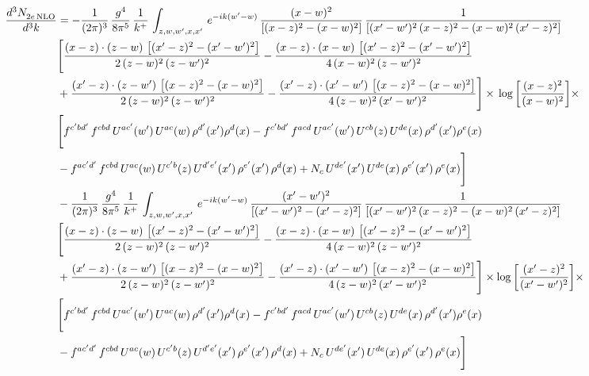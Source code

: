 \documentclass[9pt]{article}
\numberwithin{equation}{section}
\begin{document}
\begin{align}
 \frac{d^{3}N_{2e\,\rm NLO}^{\rm}}{d^{3}k}  & =   -\frac{1}{(2\pi)^{3}}\, \frac{g^{4}}{8\pi^{5}}\,\frac{1}{k^{+}}\,\int_{z,w,w^{\prime},x,x'}\, e^{-ik(w^{\prime}-w)}\,\frac{(x-w)^{2}}{\left[(x-z)^{2}-(x-w)^{2}\right]}\, \frac{1}{\left[(x'-w')^{2}\, (x-z)^{2} - (x-w)^{2}\, (x'-z)^{2}\right]} \notag \\ & \Bigg[\frac{(x-z)\cdot (z-w)\, \left[(x'-z)^{2}-(x'-w')^{2}\right]}{2\, (z-w)^{2}\, (z-w')^{2}}  - \frac{(x-z)\cdot (x-w)\,\left[(x'-z)^{2}-(x'-w')^{2}\right] }{4\,(x-w)^{2}\,(z-w')^{2}}\notag \\ & +\frac{(x'-z)\cdot (z-w')\, \left[(x-z)^{2}-(x-w)^{2}\right]}{2\, (z-w)^{2}\, (z-w')^{2}}-\frac{(x'-z)\cdot (x'-w')\, \left[(x-z)^{2}-(x-w)^{2}\right]}{4\, (z-w)^{2}\,(x'-w')^{2}}\Bigg]\times\, \log{\left[\frac{(x-z)^{2}}{(x-w)^{2}}\right]}\times\,\notag \\ & \Bigg[f^{c'bd'}\,f^{cbd}\, U^{ac'}(w')\,U^{ac}(w)\,\rho^{d'}(x')\rho^{d}(x)- f^{c'bd'}\,f^{acd}\,U^{ac'}(w')\,U^{cb}(z)\,U^{de}(x)\,\rho^{d'}(x')\rho^{e}(x) \notag \\ & -f^{ac'd'}\,f^{cbd}\,U^{ac}(w)\,U^{c'b}(z)\,U^{d'e'}(x')\,\rho^{e'}(x')\,\rho^{d}(x) +N_{c}\,U^{de'}(x')\,U^{de}(x)\,\rho^{e'}(x')\,\rho^{e}(x)\Bigg] \notag \\
& -\frac{1}{(2\pi)^{3}}\, \frac{g^{4}}{8\pi^{5}}\,\frac{1}{k^{+}}\,\int_{z,w,w^{\prime},x,x'}\, e^{-ik(w^{\prime}-w)}\, \frac{(x'-w')^{2}}{\left[(x'-w')^{2}-(x'-z)^{2}\right]}\, \frac{1}{\left[(x'-w')^{2}\, (x-z)^{2} - (x-w)^{2}\, (x'-z)^{2}\right]}  \notag \\ & \Bigg[\frac{(x-z)\cdot (z-w)\, \left[(x'-z)^{2}-(x'-w')^{2}\right]}{2\, (z-w)^{2}\, (z-w')^{2}}  - \frac{(x-z)\cdot (x-w)\,\left[(x'-z)^{2}-(x'-w')^{2}\right] }{4\,(x-w)^{2}\,(z-w')^{2}}\notag \\ & +\frac{(x'-z)\cdot (z-w')\, \left[(x-z)^{2}-(x-w)^{2}\right]}{2\, (z-w)^{2}\, (z-w')^{2}}-\frac{(x'-z)\cdot (x'-w')\, \left[(x-z)^{2}-(x-w)^{2}\right]}{4\, (z-w)^{2}\,(x'-w')^{2}}\Bigg]\times \log{\left[\frac{(x'-z)^{2}}{(x'-w')^{2}}\right]}\times\notag \\ & \Bigg[f^{c'bd'}\,f^{cbd}\, U^{ac'}(w')\,U^{ac}(w)\,\rho^{d'}(x')\rho^{d}(x)- f^{c'bd'}\,f^{acd}\,U^{ac'}(w')\,U^{cb}(z)\,U^{de}(x)\,\rho^{d'}(x')\rho^{e}(x) \notag \\ & -f^{ac'd'}\,f^{cbd}\,U^{ac}(w)\,U^{c'b}(z)\,U^{d'e'}(x')\,\rho^{e'}(x')\,\rho^{d}(x) +N_{c}\,U^{de'}(x')\,U^{de}(x)\,\rho^{e'}(x')\,\rho^{e}(x)\Bigg]
\end{align}
\end{document}
